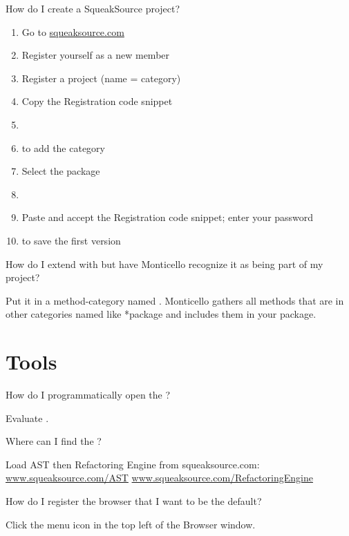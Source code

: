 \documentclass[a4paper,10pt,twoside]{book}
\begin{document}
\begin{faq}
How do I create a SqueakSource project?
\end{faq}
\answer
\begin{enumerate}
  \item Go to \url{squeaksource.com}
  \item Register yourself as a new member
  \item Register a project (name = category)
  \item Copy the Registration code snippet
  \item {}
  \item {} to add the category
  \item Select the package
  \item {}
  \item Paste and accept the Registration code snippet; enter your password
  \item {} to save the first version
\end{enumerate}

\begin{faq}
How do I extend  with  but have Monticello recognize it as being part of my  project?
\end{faq}
\answer
Put it in a method-category named .
Monticello gathers all methods that are in other categories named like *package and includes them in your package.

\section{Tools}

\begin{faq}
How do I programmatically open the  ?
\end{faq}
\answer
Evaluate .

\begin{faq}
Where can I find the ?
\end{faq}
\answer
Load AST then Refactoring Engine from squeaksource.com:
\url{www.squeaksource.com/AST}
\url{www.squeaksource.com/RefactoringEngine}

\begin{faq}
How do I register the browser that I want to be the default?
\end{faq}
\answer
Click the menu icon in the top left of the Browser window.
\end{document}
